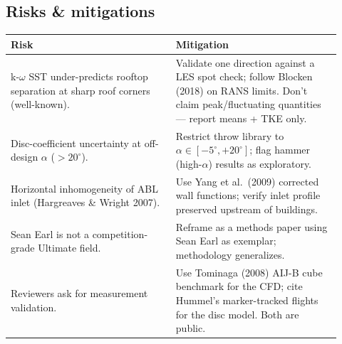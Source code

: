 \subsection{Risks \& mitigations}

\begin{center}
\footnotesize
\begin{tabular}{@{}p{0.46\linewidth}p{0.46\linewidth}@{}}
\toprule
\textbf{Risk} & \textbf{Mitigation} \\
\midrule
k-$\omega$ SST under-predicts rooftop separation at sharp roof corners (well-known). & Validate one direction against a LES spot check; follow Blocken (2018) on RANS limits. Don't claim peak/fluctuating quantities --- report means + TKE only. \\
Disc-coefficient uncertainty at off-design $\alpha$ ($>20^\circ$). & Restrict throw library to $\alpha \in [-5^\circ, +20^\circ]$; flag hammer (high-$\alpha$) results as exploratory. \\
Horizontal inhomogeneity of ABL inlet (Hargreaves \& Wright 2007). & Use Yang et al.\ (2009) corrected wall functions; verify inlet profile preserved upstream of buildings. \\
Sean Earl is not a competition-grade Ultimate field. & Reframe as a methods paper using Sean Earl as exemplar; methodology generalizes. \\
Reviewers ask for measurement validation. & Use Tominaga (2008) AIJ-B cube benchmark for the CFD; cite Hummel's marker-tracked flights for the disc model. Both are public. \\
\bottomrule
\end{tabular}
\end{center}

